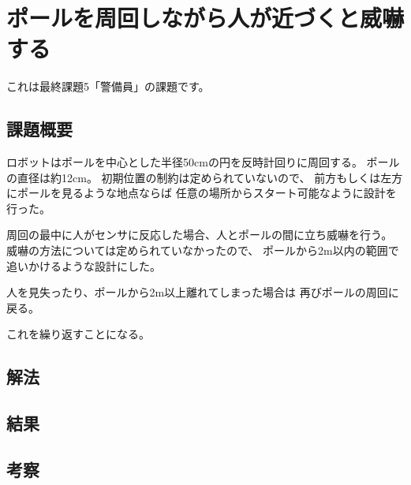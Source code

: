 \documentclass[main]{subfiles}
\begin{document}
\chapter{ポールを周回しながら人が近づくと威嚇する}

これは最終課題5「警備員」の課題です。

\section{課題概要}
ロボットはポールを中心とした半径50cmの円を反時計回りに周回する。
ポールの直径は約12cm。
初期位置の制約は定められていないので、
前方もしくは左方にポールを見るような地点ならば
任意の場所からスタート可能なように設計を行った。

周回の最中に人がセンサに反応した場合、人とポールの間に立ち威嚇を行う。
威嚇の方法については定められていなかったので、
ポールから2m以内の範囲で追いかけるような設計にした。

人を見失ったり、ポールから2m以上離れてしまった場合は
再びポールの周回に戻る。

これを繰り返すことになる。

\section{解法}
\section{結果}
\section{考察}
\end{document}
